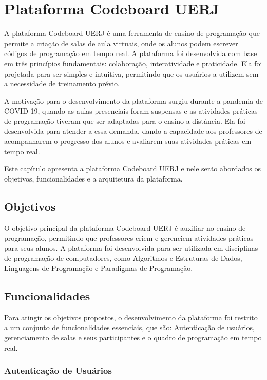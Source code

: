 \chapter{Plataforma Codeboard UERJ}

A plataforma Codeboard UERJ é uma ferramenta de ensino de programação que permite a criação de salas de aula virtuais, onde os alunos podem escrever códigos de programação em tempo real. A plataforma foi desenvolvida com base em três princípios fundamentais: colaboração, interatividade e praticidade. Ela foi projetada para ser simples e intuitiva, permitindo que os usuários a utilizem sem a necessidade de treinamento prévio. 

A motivação para o desenvolvimento da plataforma surgiu durante a pandemia de COVID-19, quando as aulas presenciais foram suspensas e as atividades práticas de programação tiveram que ser adaptadas para o ensino a distância. Ela foi desenvolvida para atender a essa demanda, dando a capacidade aos professores de acompanharem o progresso dos alunos e avaliarem suas atividades práticas em tempo real.

Este capítulo apresenta a plataforma Codeboard UERJ e nele serão abordados os objetivos, funcionalidades e a arquitetura da plataforma.	

\section{Objetivos}

O objetivo principal da plataforma Codeboard UERJ é auxiliar no ensino de programação, permitindo que professores criem e gerenciem atividades práticas para seus alunos. A plataforma foi desenvolvida para ser utilizada em disciplinas de programação de computadores, como Algoritmos e Estruturas de Dados, Linguagens de Programação e Paradigmas de Programação.


\section{Funcionalidades}

Para atingir os objetivos propostos, o desenvolvimento da plataforma foi restrito a um conjunto de funcionalidades essenciais, que são:
Autenticação de usuários, gerenciamento de salas e seus participantes e o quadro de programação em tempo real.

\subsection{Autenticação de Usuários}

